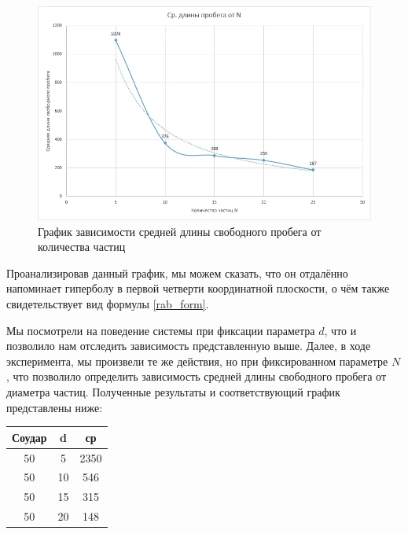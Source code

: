 \documentclass[a4paper,12pt]{article}
\begin{document}
\begin{figure}[h!]
	\begin{center}
		\includegraphics[scale=0.4]{2}
	\end{center}
	\caption{График зависимости средней длины свободного пробега от количества частиц}
\end{figure}

\newpage
Проанализировав данный график, мы можем сказать, что он отдалённо напоминает гиперболу в первой четверти координатной плоскости, о чём также свидетельствует вид формулы \eqref{rab_form}.

Мы посмотрели на поведение системы при фиксации параметра $d$, что и позволило нам отследить зависимость представленную выше. Далее, в ходе эксперимента, мы произвели те же действия, но при фиксированном параметре $N$, что позволило определить зависимость средней длины свободного пробега от диаметра частиц. Полученные результаты и соответствующий график представлены ниже:
\begin{center}
	\begin{tabular}{|c|c|c|}
		\hline
		Соудар&		d&		ср\\
		\hline
		50&		5&		2350\\
		50&		10&		546\\
		50&		15&		315\\
		50&		20&		148\\
		\hline
	\end{tabular}
\end{center}
\end{document}
